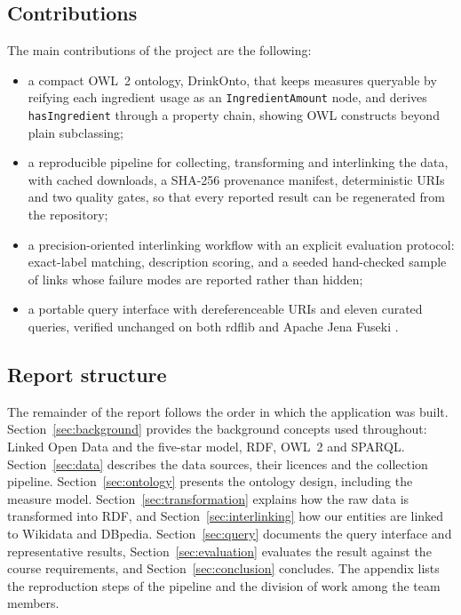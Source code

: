 \newpage
\subsection{Contributions}

The main contributions of the project are the following:

\begin{itemize}[itemsep=2pt]
  \item a compact OWL~2 ontology, DrinkOnto, that keeps measures queryable by
        reifying each ingredient usage as an \texttt{IngredientAmount} node,
        and derives \texttt{hasIngredient} through a property chain, showing
        OWL constructs beyond plain subclassing;
  \item a reproducible pipeline for collecting, transforming and interlinking
        the data, with cached downloads, a SHA-256 provenance manifest,
        deterministic URIs and two quality gates, so that every reported result
        can be regenerated from the repository;
  \item a precision-oriented interlinking workflow with an explicit evaluation
        protocol: exact-label matching, description scoring, and a seeded
        hand-checked sample of links whose failure modes are reported rather
        than hidden;
  \item a portable query interface with dereferenceable URIs and eleven
        curated queries, verified unchanged on both rdflib and Apache Jena
        Fuseki \cite{jena}.
\end{itemize}

\subsection{Report structure}

The remainder of the report follows the order in which the application was
built. Section~\ref{sec:background} provides the background concepts used
throughout: Linked Open Data and the five-star model, RDF, OWL~2 and SPARQL.
Section~\ref{sec:data} describes the data sources, their licences and the
collection pipeline. Section~\ref{sec:ontology} presents the ontology design,
including the measure model. Section~\ref{sec:transformation} explains how the
raw data is transformed into RDF, and Section~\ref{sec:interlinking} how our
entities are linked to Wikidata and DBpedia. Section~\ref{sec:query} documents
the query interface and representative results,
Section~\ref{sec:evaluation} evaluates the result against the course
requirements, and Section~\ref{sec:conclusion} concludes. The appendix lists
the reproduction steps of the pipeline and the division of work among
the team members.
